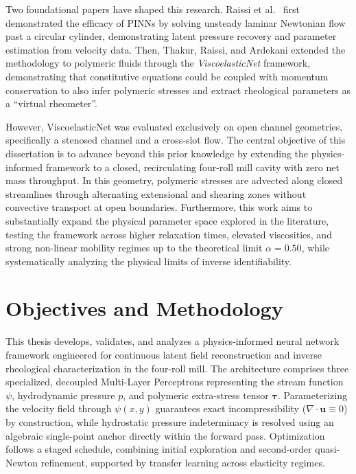 Two foundational papers have shaped this research. Raissi et al.\
\cite{raissi2019physics} first demonstrated the efficacy of PINNs by solving
unsteady laminar Newtonian flow past a circular cylinder, demonstrating latent
pressure recovery and parameter estimation from velocity data. Then, Thakur,
Raissi, and Ardekani \cite{thakur2024viscoelasticnet} extended the methodology to
polymeric fluids through the \textit{ViscoelasticNet} framework, demonstrating that
constitutive equations could be coupled with momentum conservation to also infer
polymeric stresses and extract rheological parameters as a ``virtual rheometer''.

However, ViscoelasticNet was evaluated exclusively on open channel geometries,
specifically a stenosed channel and a cross-slot flow.
The central objective of this dissertation is to advance beyond this prior knowledge by
extending the physics-informed framework to a closed, recirculating four-roll mill
cavity with zero net mass throughput. In this
geometry, polymeric stresses are advected along closed streamlines through
alternating extensional and shearing zones without convective transport at open
boundaries. Furthermore, this
work aims to substantially expand the physical parameter space explored in the
literature, testing the framework across higher relaxation times, elevated
viscosities, and strong non-linear mobility regimes up to the theoretical limit
$\alpha = 0.50$, while systematically analyzing the physical limits of inverse
identifiability.

\section{Objectives and Methodology}
\label{sec:objectives_methodology}

This thesis develops, validates, and analyzes a physics-informed neural network
framework engineered for continuous latent field reconstruction and inverse
rheological characterization in the four-roll mill. The architecture comprises
three specialized, decoupled Multi-Layer Perceptrons representing the stream
function $\psi$, hydrodynamic pressure $p$, and polymeric extra-stress tensor
$\boldsymbol{\tau}$. Parameterizing the velocity field through $\psi(x, y)$
guarantees exact incompressibility ($\nabla \cdot \boldsymbol{u} \equiv 0$) by
construction, while hydrostatic pressure indeterminacy is resolved using an
algebraic single-point anchor directly within the forward pass. Optimization
follows a staged schedule, combining initial exploration and second-order
quasi-Newton refinement, supported by transfer learning across elasticity regimes.

